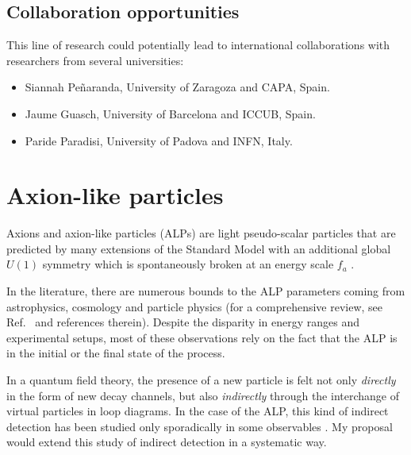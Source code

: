 \documentclass[combined.tex]{subfiles}
\begin{document}
\subsection{Collaboration opportunities}
This line of research could potentially lead to international collaborations with researchers from several universities:
\begin{itemize}
\item Siannah Peñaranda, University of Zaragoza and CAPA, Spain.
\item Jaume Guasch, University of Barcelona and ICCUB, Spain.
\item Paride Paradisi, University of Padova and INFN, Italy.
\end{itemize}

\section{Axion-like particles}
Axions and axion-like particles (ALPs) are light pseudo-scalar particles that are predicted by many extensions of the Standard Model with an additional global $U(1)$ symmetry which is spontaneously broken at an energy scale $f_a$ \cite{Peccei:1977hh,Wilczek:1977pj,Weinberg:1977ma}. 

In the literature, there are numerous bounds to the ALP parameters coming from astrophysics, cosmology \cite{Cadamuro:2011fd,Millea:2015qra,DiLuzio:2016sbl,Agrawal:2021dbo,Lucente:2021hbp} and particle physics \cite{Mimasu:2014nea,Jaeckel:2015jla,Bauer:2017ris,Brivio:2017ije,Alonso-Alvarez:2018irt,Baldenegro:2018hng,
Harland-Lang:2019zur,MartinCamalich:2020dfe,DiLuzio:2020oah,Guerrera:2021yss,Gallo:2021ame} (for a comprehensive review, see Ref.~\cite{Irastorza:2018dyq} 
and references therein). Despite the disparity in energy ranges and experimental setups, most of these observations rely on the fact that the ALP is in the initial or the final state of the process.

In a quantum field theory, the presence of a new particle is felt not only \textit{directly} in the form of new decay channels, but also \textit{indirectly} through the interchange of virtual particles in loop diagrams. In the case of the ALP, this kind of indirect detection has been studied only sporadically in some observables \cite{Bauer:2017nlg,Bauer:2017ris,Marciano:2016yhf,Bauer:2019gfk,Buen-Abad:2021fwq}. My proposal would extend this study of indirect detection in a systematic way.
\end{document}
